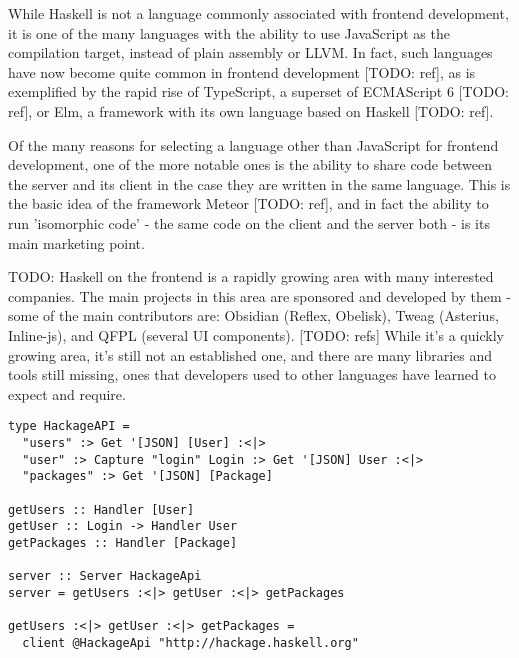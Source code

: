 \documentclass[english,odsaz]{fitthesis}
\begin{document}
While Haskell is not a language commonly associated with frontend development,
it is one of the many languages with the ability to use JavaScript as the
compilation target, instead of plain assembly or LLVM. In fact, such languages
have now become quite common in frontend development [TODO: ref], as is
exemplified by the rapid rise of TypeScript, a superset of ECMAScript 6 [TODO:
ref], or Elm, a framework with its own language based on Haskell [TODO: ref].

Of the many reasons for selecting a language other than JavaScript for frontend
development, one of the more notable ones is the ability to share code between
the server and its client in the case they are written in the same
language. This is the basic idea of the framework Meteor [TODO: ref], and in
fact the ability to run 'isomorphic code' - the same code on the client and the
server both - is its main marketing point.

TODO: Haskell on the frontend is a rapidly growing area with many interested
companies. The main projects in this area are sponsored and developed by them -
some of the main contributors are: Obsidian (Reflex, Obelisk), Tweag (Asterius,
Inline-js), and QFPL (several UI components). [TODO: refs] While it's a quickly
growing area, it's still not an established one, and there are many libraries
and tools still missing, ones that developers used to other languages have
learned to expect and require.

\begin{verbatim}
type HackageAPI =
  "users" :> Get '[JSON] [User] :<|>
  "user" :> Capture "login" Login :> Get '[JSON] User :<|>
  "packages" :> Get '[JSON] [Package]

getUsers :: Handler [User]
getUser :: Login -> Handler User
getPackages :: Handler [Package]

server :: Server HackageApi
server = getUsers :<|> getUser :<|> getPackages

getUsers :<|> getUser :<|> getPackages =
  client @HackageApi "http://hackage.haskell.org"
\end{verbatim}
\end{document}

